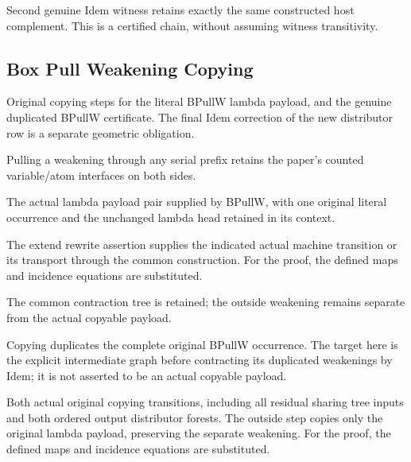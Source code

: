 Second genuine Idem witness retains exactly the same constructed host complement. This is a certified chain, without assuming witness transitivity.
\par{}

\subsection{Box Pull Weakening Copying}
Original copying steps for the literal BPullW lambda payload, and the genuine duplicated BPullW certificate. The final Idem correction of the new distributor row is a separate geometric obligation.

Pulling a weakening through any serial prefix retains the paper's counted variable/atom interfaces on both sides.
\par{}

The actual lambda payload pair supplied by BPullW, with one original literal occurrence and the unchanged lambda head retained in its context.
\par{}

The extend rewrite assertion supplies the indicated actual machine transition or its transport through the common construction.
For the proof, the defined maps and incidence equations are substituted.
\par{}

The common contraction tree is retained; the outside weakening remains separate from the actual copyable payload.
\par{}

Copying duplicates the complete original BPullW occurrence. The target here is the explicit intermediate graph before contracting its duplicated weakenings by Idem; it is not asserted to be an actual copyable payload.
\par{}

Both actual original copying transitions, including all residual sharing tree inputs and both ordered output distributor forests. The outside step copies only the original lambda payload, preserving the separate weakening.
For the proof, the defined maps and incidence equations are substituted.
\par{}


